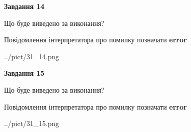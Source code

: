 \documentclass[11pt, ukrainian]{article}
\begin{document}
{\begin {large}
{\begin {center}\textbf{Завдання 14}\end {center}}\par
Що буде виведено за виконання? \par
Повідомлення інтерпретатора про помилку позначати \textbf{error}

\begin{center}
	{../pict/31_14.png}
\end{center}
\newpage

{\begin {center}\textbf{Завдання 15}\end {center}}\par
Що буде виведено за виконання? \par
Повідомлення інтерпретатора про помилку позначати \textbf{error}

\begin{center}
	{../pict/31_15.png}
\end{center}
\newpage

\end {large}}
\end{document}
